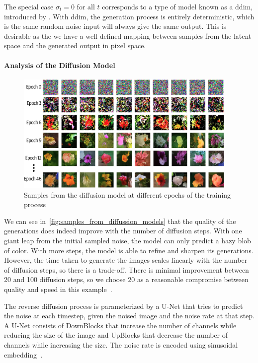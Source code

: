 The special case \( \sigma _t = 0 \) for all \( t \) corresponds to a type of model known as a \gls{ddim}, introduced by \textcite{song2022denoising}.
With \gls{ddim}, the generation process is entirely deterministic, which is the same random noise input will always give the same output.
This is desirable as the we have a well-defined mapping between samples from the latent space and the generated output in pixel space.


\paragraph{Analysis of the Diffusion Model}

\begin{figure}
	\begin{center}
		\includegraphics[width=0.95\textwidth]{figures/samples_from_diffussion_models}
	\end{center}
	\caption{Samples from the diffusion model at different epochs of the training process~\cite{foster2022generative}}\label{fig:samples_from_diffussion_models}
\end{figure}

We can see in~\autoref{fig:samples_from_diffussion_models} that the quality of the generations does indeed improve with the number of diffusion steps.
With one giant leap from the initial sampled noise, the model can only predict a hazy blob of color.
With more steps, the model is able to refine and sharpen its generations.
However, the time taken to generate the images scales linearly with the number of diffusion steps, so there is a trade-off.
There is minimal improvement between \num{20} and \num{100} diffusion steps, so we choose \num{20} as a reasonable compromise between quality and speed in this example~\cite{foster2022generative}.

The reverse diffusion process is parameterized by a U-Net that tries to predict the noise at each timestep, given the noised image and the noise rate at that step.
A U-Net consists of DownBlocks that increase the number of channels while reducing the size of the image and UpBlocks that decrease the number of channels while increasing the size.
The noise rate is encoded using sinusoidal embedding~\cite{foster2022generative}.

